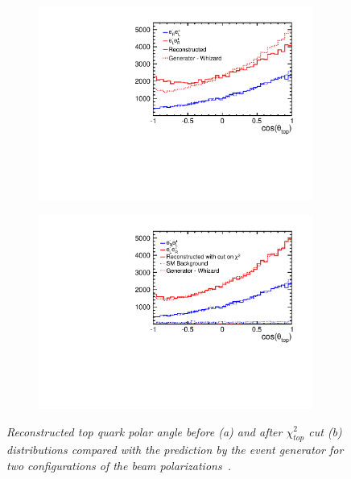 \begin{figure}[H]
	\centering
	\begin{subfigure}{0.5\textwidth}
		\includegraphics[clip, trim=0.9cm 0cm 0.9cm 0cm,width=0.99\textwidth]{ILD/graphics/EPS_AFB_nocut.pdf}
		\caption{\label{fig:ILCTOPAFB_a_3} }
	\end{subfigure}%
	\begin{subfigure}{0.5\textwidth}
		\centering
		\includegraphics[clip, trim=0.9cm 0cm 0.9cm 0cm,width=0.99\textwidth]{ILD/graphics/AFB_wbkg_chi2cut.pdf}
		\caption{\label{fig:ILCTOPAFB_b_3} }
	\end{subfigure}
	\caption{\sl Reconstructed top quark polar angle before (a) and after $\chi^2_{top}$ cut (b) distributions compared with the prediction by the event generator for two configurations of the beam polarizations~\cite{bib:ILCTOP}. }
	
	\label{fig:ILCTOPAFB}
\end{figure}

